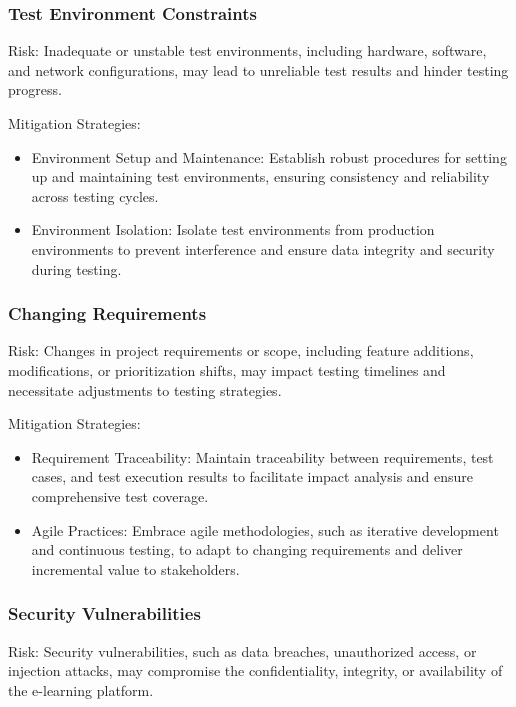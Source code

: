 		\subsubsection{Test Environment Constraints}
		
		Risk: Inadequate or unstable test environments, including hardware, software, and network configurations, may lead to unreliable test results and hinder testing progress.
		
		Mitigation Strategies:
		
		\begin{itemize}
			\item Environment Setup and Maintenance: Establish robust procedures for setting up and maintaining test environments, ensuring consistency and reliability across testing cycles.
			\item Environment Isolation: Isolate test environments from production environments to prevent interference and ensure data integrity and security during testing.
		\end{itemize}
		
		\subsubsection{Changing Requirements}
		
		Risk: Changes in project requirements or scope, including feature additions, modifications, or prioritization shifts, may impact testing timelines and necessitate adjustments to testing strategies.
		
		Mitigation Strategies:
		
		\begin{itemize}
			\item Requirement Traceability: Maintain traceability between requirements, test cases, and test execution results to facilitate impact analysis and ensure comprehensive test coverage.
			\item Agile Practices: Embrace agile methodologies, such as iterative development and continuous testing, to adapt to changing requirements and deliver incremental value to stakeholders.
		\end{itemize}
		
		\subsubsection{Security Vulnerabilities}
		
		Risk: Security vulnerabilities, such as data breaches, unauthorized access, or injection attacks, may compromise the confidentiality, integrity, or availability of the e-learning platform.
		
